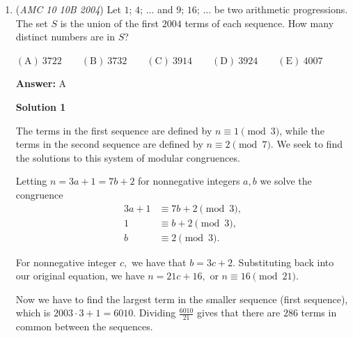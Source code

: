\begin{enumerate}
 



\textbf{Solution 6 (vector)}

Since $\frac{BT}{ET} = 4$, we have 
 \[\overrightarrow{AT} = \frac{1}{5}\overrightarrow{AB} + \frac{4}{5}\overrightarrow{AE}\]Furthermore, since $\frac{AT}{DT} = 3$, it follows that 
 \[\overrightarrow{AD} = \frac{4}{3}\overrightarrow{AT}\]Therefore, 
 \[\overrightarrow{AD} = \frac{4}{15}\overrightarrow{AB} + \frac{16}{15}\overrightarrow{AE}\]

 Let $\overrightarrow{AC} = t\overrightarrow{AE}$. Then 
 \[\overrightarrow{AD} = \frac{4}{15}\overrightarrow{AB} + \frac{16}{15t}\overrightarrow{AC}\]Since points $D$, $B$, and $C$ are collinear, 
 \[\frac{4}{15} + \frac{16}{15t} = 1 \implies t = \frac{16}{11}\]Thus, 
 \[\overrightarrow{AD} = \frac{4}{15}\overrightarrow{AB} + \frac{11}{15}\overrightarrow{AC}\]which yields 
 \[\frac{CD}{BD} = \frac{4}{11}\]



	\item (\textit{AMC 10 10B 2004}) Let $1$; $4$; $\ldots$ and $9$; $16$; $\ldots$ be two arithmetic progressions. The set $S$ is the union of the first $2004$ terms of each sequence. How many distinct numbers are in $S$?


 $\mathrm{(A) \ } 3722 \qquad \mathrm{(B) \ } 3732 \qquad \mathrm{(C) \ } 3914 \qquad \mathrm{(D) \ } 3924 \qquad \mathrm{(E) \ } 4007$

 \textbf{Answer: }A



\textbf{Solution 1}

The terms in the first sequence are defined by $n \equiv 1 \pmod3$, while the terms in the second sequence are defined by $n \equiv 2 \pmod 7.$ We seek to find the solutions to this system of modular congruences.

 Letting $n = 3a + 1 = 7b + 2$ for nonnegative integers $a,b$ we solve the congruence \begin{align*} 3a+1 &\equiv 7b+2 \pmod 3, \\ 1 &\equiv b + 2 \pmod 3, \\ b &\equiv 2 \pmod 3.\end{align*}


 For nonnegative integer $c,$ we have that $b = 3c+2$. Substituting back into our original equation, we have $n = 21c + 16,$ or $n \equiv 16 \pmod {21}.$

 Now we have to find the largest term in the smaller sequence (first sequence), which is $2003 \cdot 3 + 1 = 6010.$ Dividing $\frac{6010}{21}$ gives that there are $286$ terms in common between the sequences.


\end{enumerate}
